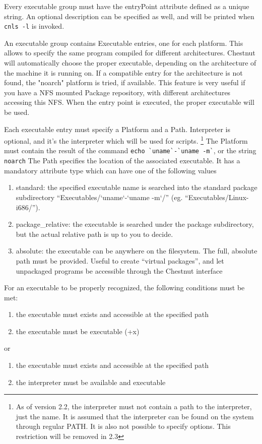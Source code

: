 Every executable group must have the entryPoint attribute defined as a unique
string.  An optional description can be specified as well, and will be printed
when \verb+cnls -l+ is invoked. 

An executable group contains Executable entries,
one for each platform. This allows to specify the same program compiled for
different architectures.  Chestnut will automatically choose the proper
executable, depending on the architecture of the machine it is running on. If a
compatible entry for the architecture is not found, the "noarch" platform is
tried, if available.  This feature is very useful if you have a NFS mounted
Package repository, with different architectures accessing this NFS. When the
entry point is executed,
the proper executable will be used.

Each executable entry must specify a Platform and a Path. Interpreter is
optional, and it's the interpreter which will be used for scripts. 
\footnote{As of version 2.2, the interpreter must not contain a path to the interpreter,
just the name. It is assumed that the interpreter can be found on the system
through regular PATH. It is also not possible to specify options. This
restriction will be removed in 2.3}
The Platform must contain the result of the command \verb+echo `uname`-`uname -m`+, or the string \verb+noarch+
The Path specifies the location of the associated executable. It has a mandatory attribute type which can have one
of the following values

\begin{enumerate}
\item standard: the specified executable name is searched into the standard package
subdirectory “Executables/`uname`-`uname -m`/” (eg. “Executables/Linux-i686/”).
\item package\_relative: the executable is searched under the package
subdirectory, but the actual relative path is up to you to decide.
\item absolute: the executable can be anywhere on the filesystem.  The full,
absolute path must be provided. Useful to create “virtual packages”, and let
unpackaged programs be accessible through the Chestnut interface 
\end{enumerate}

For an executable to be properly recognized, the following conditions must be met:
\begin{enumerate}
\item the executable must exists and accessible at the specified path
\item the executable must be executable (+x)
\end{enumerate}
or
\begin{enumerate}
\item the executable must exists and accessible at the specified path
\item the interpreter must be available and executable
\end{enumerate}

